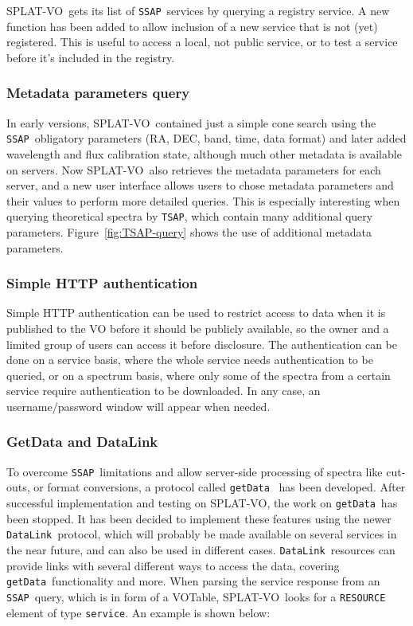 \documentclass[final,authoryear,5p,times,twocolumn]{elsarticle}
\newcommand{\datalink}{\texttt{DataLink}}
\newcommand{\ssap}{\texttt{SSAP}}
\newcommand{\tsap}{\texttt{TSAP}}
\newcommand{\getdata}{\texttt{getData}}
\newcommand{\votable}{VOTable}
\newcommand{\splatvo}{{\textsf{\small{SPLAT-VO}}}}
\begin{document}
\splatvo\ gets its list of \ssap\ services by querying a registry
service.  A new function has been added to allow inclusion of a new
service that is not (yet) registered. This is useful to access a
local, not public service, or to test a service before it's included
in the registry.

\subsubsection{Metadata parameters query}

In early versions, \splatvo\ contained just a simple cone search using
the \ssap\ obligatory parameters (RA, DEC, band, time, data format) and later
added wavelength and flux calibration state, although much other metadata is
available on servers.  Now \splatvo\ also retrieves the metadata parameters for
each server, and a new user interface allows users to chose metadata
parameters and their values to perform more detailed queries.  This is
especially interesting when querying theoretical spectra by \tsap, which contain many
additional query parameters. Figure~\ref{fig:TSAP-query} shows the
use of additional metadata parameters.

\subsubsection{Simple HTTP authentication}

Simple HTTP authentication can be used to restrict access to data when it is published to the VO before it should be
publicly available, so the owner and a limited group of users can
access it before disclosure. The authentication can be done on a
service basis, where the whole service needs authentication to be
queried, or on a spectrum basis, where only some of the spectra from a
certain service require authentication to be downloaded. In any case,
an username/password window will appear when needed.

\subsubsection{GetData and DataLink}

To overcome \ssap\ limitations and allow server-side processing of
spectra like cut-outs, or format conversions, a protocol called
\getdata\ \citep{getData}  has been developed. After successful implementation and
testing on \splatvo, the work on \getdata\ has been stopped. It has been
decided to implement these features using the newer \datalink\
protocol, which will probably be made available on several services in
the near future, and can also be used in different cases.  \datalink\
resources can provide links with several different ways to access the data,
covering \getdata\ functionality and more.
When parsing the service response from an \ssap\ query, which is in form
of a \votable, \splatvo\ looks for a \texttt{RESOURCE} element of type \texttt{service}.
An example is shown below:
\end{document}
